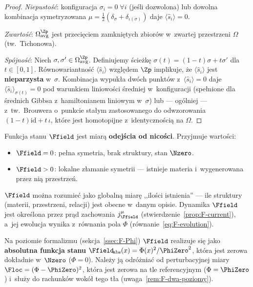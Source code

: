 \begin{proof}
\emph{Niepusto\'s\'c}: konfiguracja $\sigma_i = 0\;\forall i$
(je\'sli dozwolona) lub dowolna kombinacja symetryzowana
$\mu = \frac{1}{2}(\delta_\sigma + \delta_{\iota(\sigma)})$
daje $\langle\hat{s}_i\rangle = 0$.

\emph{Zwarto\'s\'c}: $\Omega^{\Zp}_{\mathrm{avg}}$ jest
przeci\k{e}ciem zamkni\k{e}tych zbior\'ow w~zwartej
przestrzeni $\Omega$ (tw.~Tichonowa).

\emph{Sp\'ojno\'s\'c}: Niech $\sigma, \sigma' \in
\Omega^{\Zp}_{\mathrm{avg}}$. Definiujemy \'scie\.zk\k{e}
$\sigma(t) = (1-t)\sigma + t\sigma'$ dla $t\in[0,1]$.
R\'ownowariantno\'s\'c $\langle\hat{s}_i\rangle$ wzgl\k{e}dem
$\Zp$ implikuje, \.ze $\langle\hat{s}_i\rangle$ jest
\textbf{nieparzysta} w~$\sigma$. Kombinacja wypuk\l{}a dw\'och
punkt\'ow z~$\langle\hat{s}_i\rangle = 0$ daje
$\langle\hat{s}_i\rangle_{\sigma(t)} = 0$ pod warunkiem
liniowo\'sci \'sredniej w~konfiguracji (spe\l{}nione
dla \'srednich Gibbsa z~hamiltonianem liniowym w~$\sigma$)
lub --- og\'olniej --- z~tw.~Brouwera o~punkcie sta\l{}ym
zastosowanego do odwzorowania $(1-t)\mathrm{id} + t\,\iota$,
kt\'ore jest homotopijne z~identyczno\'sci\k{a} na $\Omega$.
\end{proof}

\begin{definition}\label{def:F}
Funkcja stanu $\Ffield$ jest miar\k{a} \textbf{odej\'scia od nico\'sci}.
Przyjmuje warto\'sci:
\begin{itemize}[nosep]
  \item $\Ffield = 0$: pe\l{}na symetria, brak struktury, stan $\Nzero$.
  \item $\Ffield > 0$: lokalne z\l{}amanie symetrii --- istnieje materia
        i~wygenerowana przez ni\k{a} przestrze\'n.
\end{itemize}
$\Ffield$ mo\.zna rozumie\'c jako globaln\k{a} miar\k{e} ,,ilo\'sci
istnienia'' --- ile struktury (materii, przestrzeni, relacji)
jest obecne w~danym opisie. Dynamika $\Ffield$ jest okre\'slona
przez pr\k{a}d zachowania $j_{\Ffield}^\mu$
(stwierdzenie~\ref{prop:F-current}), a~jej ewolucja wynika
z~r\'ownania pola $\Phi$ (r\'ownanie~\ref{eq:F-evolution}).

Na poziomie formalizmu (sekcja~\ref{ssec:F-Phi}) $\Ffield$ realizuje
si\k{e} jako \textbf{absolutna funkcja stanu}
$\Ffield_{\!\mathrm{abs}}(x) = \Phi(x)^2/\PhiZero^2$,
kt\'ora jest zerowa dok\l{}adnie w~$\Nzero$ ($\Phi = 0$).
Nale\.zy j\k{a} odr\'o\.znia\'c od perturbacyjnej miary
$\Floc = (\Phi - \PhiZero)^2$, kt\'ora jest zerowa
na tle referencyjnym ($\Phi = \PhiZero$) i~s\l{}u\.zy
do rachunk\'ow wok\'o\l{} tego t\l{}a
(uwaga~\ref{rem:F-dwa-poziomy}).
\end{definition}

